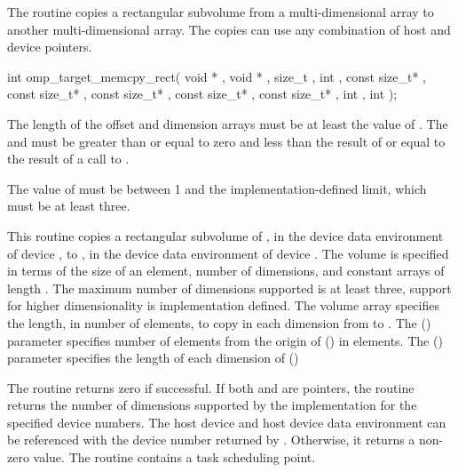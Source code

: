 \begin{ccppspecific}
The  routine copies a rectangular subvolume from
a multi-dimensional array to another multi-dimensional array. The copies can
use any combination of host and device pointers.

\format
\begin{samepage}
\begin{boxedcode}
int omp\_target\_memcpy\_rect(
               void * , void * ,
               size\_t ,
               int ,
               const size\_t* ,
               const size\_t* ,
               const size\_t* ,
               const size\_t* ,
               const size\_t* ,
               int , int );
\end{boxedcode}
\end{samepage}

\newpage
{}
\constraints
The length of the offset and dimension arrays must be at least the
value of .
The  and 
must be greater than or equal to zero and less than the result of
 or equal to the result of a call to
.

The value of  must be between 1 and the implementation-defined
limit, which must be at least three.


\effect

This routine copies a rectangular subvolume of ,
in the device data environment of device ,
to , in the device data environment of device .
The volume is specified in terms of the size of an element, 
number of dimensions, and constant arrays of length .  The 
maximum number of dimensions supported is at least three, support for higher 
dimensionality is implementation defined. The volume array specifies the 
length, in number of elements, to copy in each dimension from  
to . The  () parameter specifies
number of elements from the origin of  () in elements.  
The  () parameter specifies the 
length of each dimension of  ()

The routine returns zero if successful. If both  and  are
 pointers, the routine returns the number of dimensions supported
by the implementation for the specified device numbers. The host device and
host device data environment can be referenced with the device number returned
by .  Otherwise, it returns a non-zero value. The
routine contains a task scheduling point.


\end{ccppspecific}
